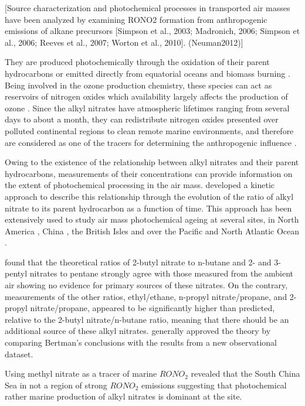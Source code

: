 \documentclass[11pt,a4paper]{article}
\begin{document}
[Source characterization and photochemical processes in
transported air masses have been analyzed by examining
RONO2 formation from anthropogenic emissions of alkane
precursors [Simpson et al., 2003; Madronich, 2006; Simpson
et al., 2006; Reeves et al., 2007; Worton et al., 2010]. (Neuman2012)]

They are produced photochemically through the oxidation of their parent hydrocarbons \citep{Roberts1990} or emitted directly from equatorial oceans \citep{Blake2003} and biomass burning \citep{Simpson2002}. Being involved in the ozone production chemistry, these species can act as reservoirs of nitrogen oxides which availability largely affects the production of ozone \citep{Reeves2007}. Since the alkyl nitrates have atmospheric lifetimes ranging from several days to about a month, they can redistribute nitrogen oxides presented over polluted continental regions to clean remote marine environments, and therefore are considered as one of the tracers for determining the anthropogenic influence \citep{Atherton1989, Reeves2007, Worton2005}.

Owing to the existence of the relationship between alkyl nitrates and their parent hydrocarbons, measurements of their concentrations can provide information on the extent of photochemical processing in the air mass. \cite{Bertman1995} developed a kinetic approach to describe this relationship through the evolution of the ratio of alkyl nitrate to its parent hydrocarbon as a function of time. This approach has been extensively used to study air mass photochemical ageing at several sites, in North America \citep{Bertman1995, Roberts1998}, China \citep{Simpson2006}, the British Isles \citep{Worton2010} and over the Pacific \citep{Simpson2003} and North Atlantic Ocean \citep{Reeves2007}.

\cite{Bertman1995} found that the theoretical ratios of  2-butyl nitrate to n-butane and 2- and 3-pentyl nitrates to pentane strongly agree with those measured from the ambient air showing no evidence for primary sources of these nitrates. On the contrary, measurements of the other ratios, ethyl/ethane, n-propyl nitrate/propane, and 2-propyl nitrate/propane, appeared to be significantly higher than predicted, relative to the 2-butyl nitrate/n-butane ratio, meaning that there should be an additional source of these alkyl nitrates. \cite{Roberts1998} generally approved the theory by comparing Bertman's conclusions with the results from a new observational dataset.

Using methyl nitrate as a tracer of marine $RONO_2$ \cite{Simpson2006} revealed that the South China Sea in not a region of strong $RONO_2$ emissions suggesting that photochemical rather marine production of alkyl nitrates is dominant at the site.
\end{document}
